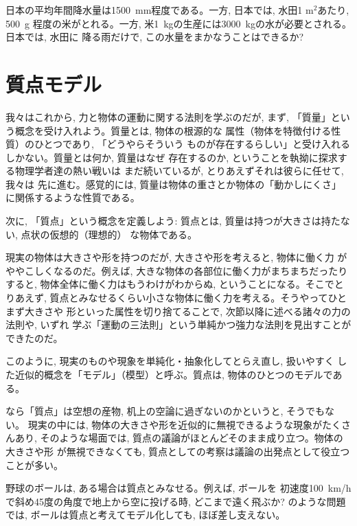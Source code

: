 \begin{q}\label{q:Japan_rain_paddy}
日本の平均年間降水量は1500~mm程度である。一方, 日本では, 水田1 m$^2$あたり, 500~g
程度の米がとれる。一方, 米1~kgの生産には3000~kgの水が必要とされる。日本では, 水田に
降る雨だけで, この水量をまかなうことはできるか?
\end{q}
\hv



\section{質点モデル}

我々はこれから, 力と物体の運動に関する法則を学ぶのだが, まず, 
「質量」という概念を受け入れよう。質量とは, 物体の根源的な
属性（物体を特徴付ける性質）のひとつであり, 「どうやらそういう
ものが存在するらしい」と受け入れるしかない。質量とは何か, 質量はなぜ
存在するのか, ということを執拗に探求する物理学者達の熱い戦いは
まだ続いているが, とりあえずそれは彼らに任せて, 我々は
先に進む。感覚的には, 質量は物体の重さとか物体の「動かしにくさ」
に関係するような性質である。\mv

次に, 「質点」という概念を定義しよう: 
質点とは, 質量は持つが大きさは持たない, 点状の仮想的（理想的）
な物体である。

現実の物体は大きさや形を持つのだが, 大きさや形を考えると, 物体に働く力
がややこしくなるのだ。例えば, 大きな物体の各部位に働く力がまちまちだったりすると, 
物体全体に働く力はもうわけがわからぬ, ということになる。そこでとりあえず, 
質点とみなせるくらい小さな物体に働く力を考える。そうやってひとまず大きさや
形といった属性を切り捨てることで, 次節以降に述べる諸々の力の法則や, いずれ
学ぶ「運動の三法則」という単純かつ強力な法則を見出すことができたのだ。

このように, 現実のものや現象を単純化・抽象化してとらえ直し, 扱いやすく
した近似的概念を「モデル」（模型）と呼ぶ。質点は, 
物体のひとつのモデルである。

なら「質点」は空想の産物, 机上の空論に過ぎないのかというと, そうでもない。
現実の中には, 物体の大きさや形を近似的に無視できるような現象がたくさんあり, 
そのような場面では, 質点の議論がほとんどそのまま成り立つ。物体の大きさや形
が無視できなくても, 質点としての考察は議論の出発点として役立つことが多い。

\begin{exmpl} 野球のボールは, ある場合は質点とみなせる。例えば, ボールを
初速度100~km/hで斜め45度の角度で地上から空に投げる時, どこまで遠く飛ぶか?
のような問題では, ボールは質点と考えてモデル化しても, ほぼ差し支えない。
\end{exmpl}

